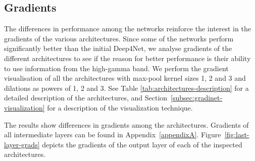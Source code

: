 \clearpage

\subsection{Gradients}\label{subsec:gradients}
The differences in performance among the networks reinforce the interest in the gradients of the various architectures.
Since some of the networks perform significantly better than the initial Deep4Net, we analyse gradients of the different architectures to see if the reason for better performance is their ability to use information from the high-gamma band.
We perform the gradient visualisation of all the architectures with max-pool kernel sizes 1, 2 and 3 and dilations as powers of 1, 2 and 3. See Table \ref{tab:architectures-description} for a detailed description of the architectures, and Section~\ref{subsec:gradinet-visualization} for a description of the visualization technique.

The results show differences in gradients among the architectures.
Gradients of all intermediate layers can be found in Appendix~\ref{appendixA}.
Figure~\ref{fig:last-layer-grads} depicts the gradients of the output layer of each of the inspected architectures.

